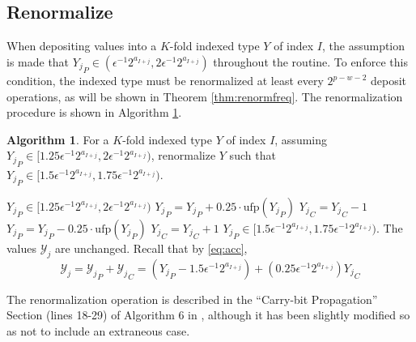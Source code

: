 \documentclass[12pt]{article}
\providecommand{\ufp}{\ensuremath{\text{ufp}}}
\providecommand{\To}{\ensuremath{\text{ to }}}
\theoremstyle{definition}
\newtheorem{alg}{Algorithm}[section]
\numberwithin{equation}{section}
\numberwithin{figure}{section}
\begin{document}
  \subsection{Renormalize}
    \label{sec:primitiveops_renormalize}
    When depositing values into a $K$-fold indexed type $Y$ of index $I$, the assumption is made that ${Y_j}_P \in (\epsilon^{-1} 2^{a_{I + j}}, 2  \epsilon^{-1} 2^{a_{I + j}})$ throughout the routine. To enforce this condition, the indexed type must be renormalized at least every $2^{p - w - 2}$ deposit operations, as will be shown in Theorem \ref{thm:renormfreq}. The renormalization procedure is shown in Algorithm \ref{alg:renorm}.

    \begin{samepage}
    \begin{alg}
      For a $K$-fold indexed type $Y$ of index $I$, assuming ${Y_j}_P \in [1.25  \epsilon^{-1} 2^{a_{I + j}}, 2  \epsilon^{-1} 2^{a_{I + j}})$, renormalize $Y$ such that ${Y_j}_P \in [1.5  \epsilon^{-1} 2^{a_{I + j}}, 1.75  \epsilon^{-1} 2^{a_{I + j}})$.
      \begin{algorithmic}[1]
        \Require
          \Statex ${Y_j}_P \in [1.25  \epsilon^{-1} 2^{a_{I + j}}, 2  \epsilon^{-1} 2^{a_{I + j}})$
          \For{$j = 0 \To K - 1$}
            \If{${Y_j}_P < 1.5 \cdot \ufp({Y_j}_P)$}
              \State ${Y_j}_P = {Y_j}_P + 0.25 \cdot \ufp({Y_j}_P)$
              \State ${Y_j}_C = {Y_j}_C - 1$
            \EndIf
            \If{${Y_j}_P \geq 1.75 \cdot \ufp({Y_j}_P)$}
              \State ${Y_j}_P = {Y_j}_P - 0.25 \cdot \ufp({Y_j}_P)$
              \State ${Y_j}_C = {Y_j}_C + 1$
            \EndIf
          \EndFor
        \EndFunction
        \Ensure
          \Statex ${Y_j}_P \in [1.5  \epsilon^{-1} 2^{a_{I + j}}, 1.75  \epsilon^{-1} 2^{a_{I + j}})$.
          \Statex The values $\mathcal{Y}_j$ are unchanged. Recall that by \eqref{eq:acc},
          \begin{equation*}
            \mathcal{Y}_j = {\mathcal{Y}_j}_P + {\mathcal{Y}_j}_C = ({Y_j}_P - 1.5 \epsilon^{-1} 2^{a_{I + j}}) + (0.25\epsilon^{-1}2^{a_{I + j}}){Y_j}_C
          \end{equation*}
      \end{algorithmic}
      \label{alg:renorm}
    \end{alg}
    \end{samepage}
    The renormalization operation is described in the ``Carry-bit Propagation'' Section (lines 18-29) of Algorithm $6$ in \cite{repsum}, although it has been slightly modified so as not to include an extraneous case.
\end{document}
